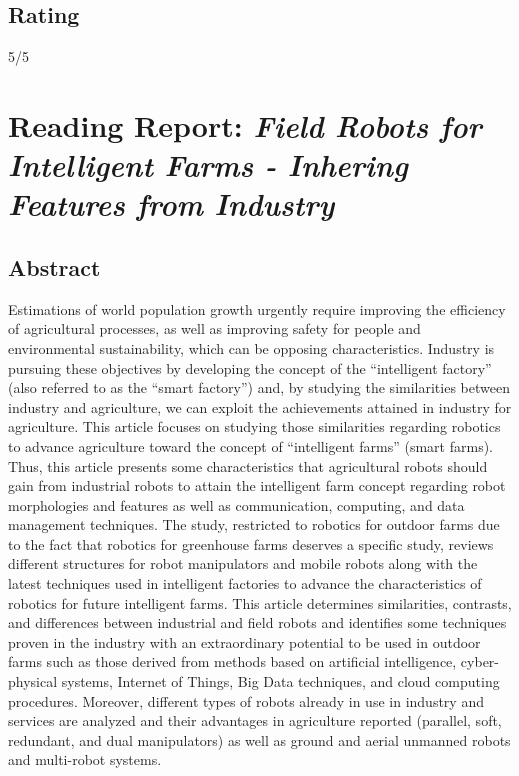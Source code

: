 \documentclass{article}
\begin{document}
\subsection*{Rating}
5/5


\section{Reading Report: \emph{Field Robots for Intelligent Farms - Inhering Features from Industry}}
\cite{deSantos2020}

\subsection*{Abstract}
Estimations of world population growth urgently require improving the efficiency of
agricultural processes, as well as improving safety for people and environmental sustainability,
which can be opposing characteristics. Industry is pursuing these objectives by developing the
concept of the “intelligent factory” (also referred to as the “smart factory”) and, by studying the
similarities between industry and agriculture, we can exploit the achievements attained in industry
for agriculture. This article focuses on studying those similarities regarding robotics to advance
agriculture toward the concept of “intelligent farms” (smart farms). Thus, this article presents some
characteristics that agricultural robots should gain from industrial robots to attain the intelligent farm
concept regarding robot morphologies and features as well as communication, computing, and data
management techniques. The study, restricted to robotics for outdoor farms due to the fact that robotics
for greenhouse farms deserves a specific study, reviews different structures for robot manipulators and
mobile robots along with the latest techniques used in intelligent factories to advance the characteristics
of robotics for future intelligent farms. This article determines similarities, contrasts, and differences
between industrial and field robots and identifies some techniques proven in the industry with an
extraordinary potential to be used in outdoor farms such as those derived from methods based on
artificial intelligence, cyber-physical systems, Internet of Things, Big Data techniques, and cloud
computing procedures. Moreover, different types of robots already in use in industry and services
are analyzed and their advantages in agriculture reported (parallel, soft, redundant, and dual
manipulators) as well as ground and aerial unmanned robots and multi-robot systems.
\end{document}
